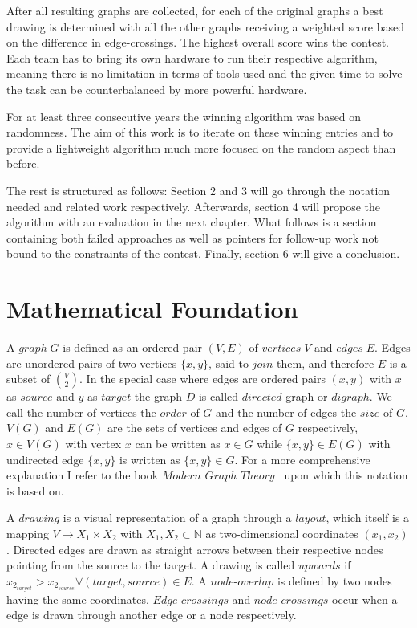 \documentclass[]{llncs}
\begin{document}
After all resulting graphs are collected, for each of the original graphs a best drawing is determined with all the other graphs receiving a weighted score based on the difference in edge-crossings. The highest overall score wins the contest. Each team has to bring its own hardware to run their respective algorithm, meaning there is no limitation in terms of tools used and the given time to solve the task can be counterbalanced by more powerful hardware.

For at least three consecutive years the winning algorithm was based on randomness. The aim of this work is to iterate on these winning entries and to provide a lightweight algorithm much more focused on the random aspect than before.

The rest is structured as follows: Section 2 and 3 will go through the notation needed and related work respectively. Afterwards, section 4 will propose the algorithm with an evaluation in the next chapter. What follows is a section containing both failed approaches as well as pointers for follow-up work not bound to the constraints of the contest. Finally, section 6 will give a conclusion.

	\section{Mathematical Foundation}
	A $graph\;G$ is defined as an ordered pair $(V, E)$ of $vertices\;V$ and $edges\;E$. Edges are unordered pairs of two vertices $\{x,y\}$, said to $join$  them, and therefore $E$ is a subset of $V \choose 2$. In the special case where edges are ordered pairs $(x,y)$ with $x$ as $source$ and $y$ as $target$ the graph $D$ is called $directed$ graph or $digraph$. We call the number of vertices the $order$ of $G$ and the number of edges the $size$ of $G$. $V(G)$ and $E(G)$ are the sets of vertices and edges of $G$ respectively, $x \in V(G)$ with vertex $x$ can be written as $x \in G$ while $\{x, y\} \in E(G)$ with undirected edge $\{x,y\}$ is written as $\{x,y\} \in G$. For a more comprehensive explanation I refer to the book $Modern$ $Graph$ $Theory$~\cite{bollobas98} upon which this notation is based on.

A $drawing$ is a visual representation of a graph through a $layout$, which itself is a mapping $V \longrightarrow X_1 \times X_2$ with $X_1,X_2 \subset \mathds{N}$ as two-dimensional coordinates $(x_1, x_2)$. Directed edges are drawn as straight arrows between their respective nodes pointing from the source to the target. A drawing is called $upwards$ if $x_{2_{target}} > x_{2_{source}} \forall (target, source) \in E$. A $node$-$overlap$ is defined by two nodes having the same coordinates. $Edge$-$crossings$ and $node$-$crossings$ occur when a edge is drawn through another edge or a node respectively.
\end{document}
